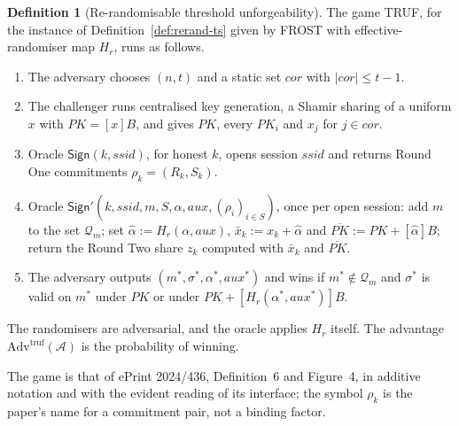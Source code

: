 \documentclass[11pt,a4paper]{article}
\theoremstyle{definition}
\newtheorem{definition}[theorem]{Definition}
\newcommand{\Adv}{\mathcal{A}}
\begin{document}
\begin{definition}[Re-randomisable threshold unforgeability]\label{def:truf}
The game TRUF, for the instance of Definition~\ref{def:rerand-ts} given by
FROST with effective-randomiser map \(H_r\), runs as follows.
\begin{enumerate}
\item The adversary chooses \((n, t)\) and a static set \(\mathit{cor}\)
  with \(\lvert \mathit{cor} \rvert \le t - 1\).
\item The challenger runs centralised key generation, a Shamir sharing of a
  uniform \(x\) with \(\mathit{PK} = [x]B\), and gives \(\mathit{PK}\),
  every \(\mathit{PK}_i\) and \(x_j\) for \(j \in \mathit{cor}\).
\item Oracle \(\mathsf{Sign}(k, \mathit{ssid})\), for honest \(k\), opens
  session \(\mathit{ssid}\) and returns Round One commitments
  \(\rho_k = (R_k, S_k)\).
\item Oracle \(\mathsf{Sign}'(k, \mathit{ssid}, m, S, \alpha,
  \mathit{aux}, (\rho_i)_{i \in S})\), once per open session: add \(m\) to
  the set \(\mathcal{Q}_m\); set \(\hat{\alpha} := H_r(\alpha,
  \mathit{aux})\), \(\bar{x}_k := x_k + \hat{\alpha}\) and
  \(\overline{\mathit{PK}} := \mathit{PK} + [\hat{\alpha}]B\); return the
  Round Two share \(z_k\) computed with \(\bar{x}_k\) and
  \(\overline{\mathit{PK}}\).
\item The adversary outputs \((m^{*}, \sigma^{*}, \alpha^{*},
  \mathit{aux}^{*})\) and wins if \(m^{*} \notin \mathcal{Q}_m\) and
  \(\sigma^{*}\) is valid on \(m^{*}\) under \(\mathit{PK}\) or under
  \(\mathit{PK} + [H_r(\alpha^{*}, \mathit{aux}^{*})]B\).
\end{enumerate}
The randomisers are adversarial, and the oracle applies \(H_r\) itself.
The advantage \(\mathrm{Adv}^{\mathrm{truf}}(\Adv)\) is the probability of
winning.
\end{definition}

The game is that of ePrint 2024/436, Definition~6 and Figure~4, in additive
notation and with the evident reading of its interface; the symbol
\(\rho_k\) is the paper's name for a commitment pair, not a binding factor.
\end{document}
